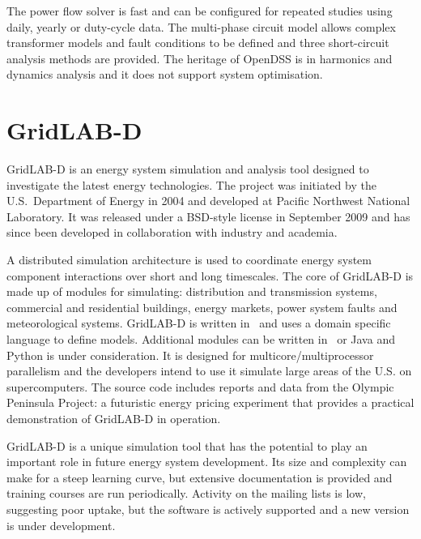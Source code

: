 The power flow solver is fast and can be configured for repeated studies using
daily, yearly or duty-cycle data.  The multi-phase circuit model allows complex
transformer models and fault conditions to be defined and three short-circuit
analysis methods are provided.  The heritage of OpenDSS is in harmonics and
dynamics analysis and it does not support system optimisation.

\section{GridLAB-D}
GridLAB-D is an energy system simulation and analysis tool
designed to investigate the latest energy technologies.  The project was
initiated by the U.S.~Department of Energy in 2004 and developed at Pacific
Northwest National Laboratory.  It was released under a BSD-style license in
September 2009 and has since been developed in collaboration with industry and
academia.

A distributed simulation architecture is used to coordinate energy system
component interactions over short and long timescales.  The core of GridLAB-D is
made up of modules for simulating: distribution and transmission systems,
commercial and residential buildings, energy markets, power system faults and
meteorological systems.  GridLAB-D is written in \CC~and uses a domain specific
language to define models.  Additional modules can be written in \CC~or Java and
Python is under consideration.  It is designed for multicore/multiprocessor
parallelism and the developers intend to use it simulate large areas of the U.S.
on supercomputers.  The source code includes reports and data from the Olympic
Peninsula Project: a futuristic energy pricing experiment that provides a
practical demonstration of GridLAB-D in operation.

GridLAB-D is a unique simulation tool that has the potential to play an
important role in future energy system development.  Its size and complexity
can make for a steep learning curve, but extensive documentation is provided
and training courses are run periodically.  Activity on the mailing lists is low,
suggesting poor uptake, but the software is actively supported and a new
version is under development.

